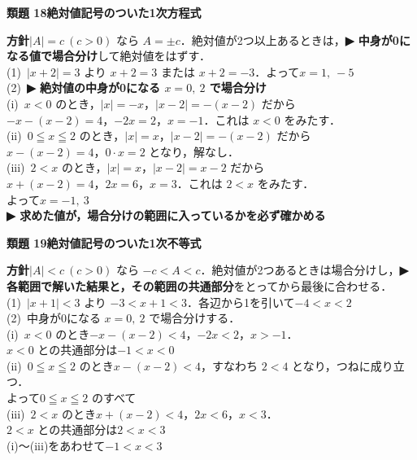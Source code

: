 \documentclass[a4paper,11pt]{ltjsarticle}
\newcommand{\ans}[2]{\Needspace{5\baselineskip}\vspace{6pt}%
  {\sffamily\bfseries 類題 #1\quad #2}\par}
\newcommand{\point}[1]{\textsf{\bfseries ▶ #1}}
\begin{document}
\ans{18}{絶対値記号のついた1次方程式}
\begin{kai}
\textbf{方針}\quad $|A|=c\ (c>0)$ なら $A=\pm c$．絶対値が2つ以上あるときは，\point{中身が0になる値で場合分け}して絶対値をはずす．\\[2pt]
(1)\ $|x+2|=3$ より $x+2=3$ または $x+2=-3$．\quad よって\quad $x=1,\ -5$\\[2pt]
(2)\ \point{絶対値の中身が0になる $x=0,\ 2$ で場合分け}\\
\hspace*{1.5em}(i)\ $x<0$ のとき，$|x|=-x$，$|x-2|=-(x-2)$ だから\\
\hspace*{3em}$-x-(x-2)=4$，\quad $-2x=2$，\quad $x=-1$．これは $x<0$ をみたす．\\
\hspace*{1.5em}(ii)\ $0\leqq x\leqq2$ のとき，$|x|=x$，$|x-2|=-(x-2)$ だから\\
\hspace*{3em}$x-(x-2)=4$，\quad $0\cdot x=2$ となり，解なし．\\
\hspace*{1.5em}(iii)\ $2<x$ のとき，$|x|=x$，$|x-2|=x-2$ だから\\
\hspace*{3em}$x+(x-2)=4$，\quad $2x=6$，\quad $x=3$．これは $2<x$ をみたす．\\
\hspace*{1.5em}よって\quad $x=-1,\ 3$\\
\hspace*{1.5em}\point{求めた値が，場合分けの範囲に入っているかを必ず確かめる}
\end{kai}

\ans{19}{絶対値記号のついた1次不等式}
\begin{kai}
\textbf{方針}\quad $|A|<c\ (c>0)$ なら $-c<A<c$．絶対値が2つあるときは場合分けし，\point{各範囲で解いた結果と，その範囲の共通部分}をとってから最後に合わせる．\\[2pt]
(1)\ $|x+1|<3$ より $-3<x+1<3$．各辺から1を引いて\quad $-4<x<2$\\[2pt]
(2)\ 中身が0になる $x=0,\ 2$ で場合分けする．\\
\hspace*{1.5em}(i)\ $x<0$ のとき\quad $-x-(x-2)<4$，$-2x<2$，$x>-1$．\\
\hspace*{3em}$x<0$ との共通部分は\quad $-1<x<0$\\
\hspace*{1.5em}(ii)\ $0\leqq x\leqq2$ のとき\quad $x-(x-2)<4$，すなわち $2<4$ となり，つねに成り立つ．\\
\hspace*{3em}よって\quad $0\leqq x\leqq2$ のすべて\\
\hspace*{1.5em}(iii)\ $2<x$ のとき\quad $x+(x-2)<4$，$2x<6$，$x<3$．\\
\hspace*{3em}$2<x$ との共通部分は\quad $2<x<3$\\
\hspace*{1.5em}(i)〜(iii)をあわせて\quad $-1<x<3$
\end{kai}
\end{document}
